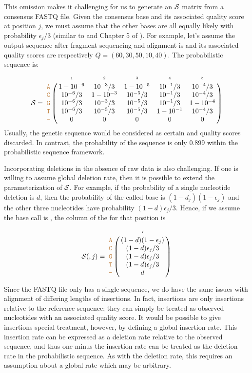 \documentclass[10pt]{article}
\begin{document}
This omission makes it challenging for us to generate an $\mathcal{S}$ matrix from a consensus FASTQ file.
Given the consensus base and its associated quality score at position $j$, we must assume that the other bases are all equally likely with probability $\epsilon_j/3$ (similar to \cite{kuoEAGLEExplicitAlternative2018} and Chapter 5 of \citet{kozlovModelsOptimizationsTools2018}).
For example, let's assume the output sequence after fragment sequencing and alignment is  and its associated quality scores are respectively $Q=(60,30,50,10,40)$.
The probabilistic sequence is:
\begin{equation}
\nps = 
\bordermatrix{
&\scriptscriptstyle{1} & \scriptscriptstyle{2}& \scriptscriptstyle{3}& \scriptscriptstyle{4} & \scriptscriptstyle{5} \cr
\sq{A} & 1-10^{-6} & 10^{-3}/3  & 1-10^{-5} & 10^{-1}/3 & 10^{-4}/3  \cr
\sq{C} & 10^{-6}/3 & 1-10^{-3}  & 10^{-5}/3 & 10^{-1}/3 & 10^{-4}/3  \cr
\sq{G} & 10^{-6}/3 & 10^{-3}/3  & 10^{-5}/3 & 10^{-1}/3 & 1-10^{-4} \cr
\sq{T} & 10^{-6}/3 & 10^{-3}/3  & 10^{-5}/3 & 1-10^{-1} & 10^{-4}/3 \cr
\sq{-} & 0 & 0 & 0 & 0 & 0 \cr
}
\end{equation}
Usually, the genetic sequence  would be considered as certain and quality scores discarded.
In contrast, the probability of the sequence  is only 0.899 within the probabilistic sequence framework.


Incorporating deletions in the absence of raw data is also challenging.
If one is willing to assume global deletion rate, then it is possible to extend the parameterization of $\mathcal{S}$.
For example, if the probability of a single nucleotide deletion is $d$, then the probability of the called base is $(1-d_j)(1-\epsilon_j)$ and the other three nucleotides have probability $(1-d)\epsilon_j/3$.
Hence, if we assume the base call is , the column of the \nlps for that position is
\begin{equation}
\nps(,j) = 
\bordermatrix{
&\scriptscriptstyle{j}  \cr
\sq{A} & (1 - d)(1-\epsilon_j) \cr
\sq{C} & (1 - d)\epsilon_j/3 \cr
\sq{G} & (1 - d)\epsilon_j/3 \cr
\sq{T} & (1 - d)\epsilon_j/3 \cr
\sq{-} & d \cr
}
\label{eq:deletion}
\end{equation}

Since the FASTQ file only has a single sequence, we do have the same issues with alignment of differing lengths of insertions.
In fact, insertions are only insertions relative to the reference sequence; they can simply be treated as observed nucleotides with an associated quality score.
It would be possible to give insertions special treatment, however, by defining a global insertion rate.
This insertion rate can be expressed as a deletion rate relative to the observed sequence, and thus one minus the insertion rate can be treated as the deletion rate in the probabilistic sequence.
As with the deletion rate, this requires an assumption about a global rate which may be arbitrary.
\end{document}
